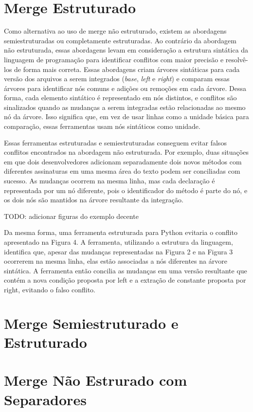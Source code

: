 \section{Merge Estruturado}
Como alternativa ao uso de merge não estruturado, existem as abordagens
semiestruturadas ou completamente estruturadas. Ao contrário da abordagem não
estruturada, essas abordagens levam em consideração a estrutura sintática da
linguagem de programação para identificar conflitos com maior precisão e resolvê-los de 
forma mais correta. Essas abordagens criam árvores sintáticas para
cada versão dos arquivos a serem integrados (\emph{base}, \emph{left} e \emph{right}) 
e comparam essas árvores para identificar nós comuns
e adições ou remoções em cada árvore. Dessa forma, cada elemento sintático
é representado em nós distintos, e conflitos são sinalizados quando as mudanças
a serem integradas estão relacionadas ao mesmo nó da árvore. Isso significa
que, em vez de usar linhas como a unidade básica para comparação, essas ferramentas usam
nós sintáticos como unidade.

Essas ferramentas estruturadas e semiestruturadas conseguem evitar falsos conflitos
encontrados na abordagem não estruturada. Por exemplo, duas situações em
que dois desenvolvedores adicionam separadamente dois novos métodos com diferentes
assinaturas em uma mesma área do texto podem ser conciliadas com sucesso.
As mudanças ocorrem na mesma linha, mas cada declaração é representada por
um nó diferente, pois o identificador do método é parte do nó,
e os dois nós são mantidos na árvore resultante da integração.

TODO: adicionar figuras do exemplo decente

Da mesma forma, uma ferramenta estruturada para Python evitaria o
conflito apresentado na Figura 4. A ferramenta, utilizando a estrutura da
linguagem, identifica que, apesar das mudanças representadas na Figura 2 e na
Figura 3 ocorrerem na mesma linha, elas estão associadas a nós diferentes na árvore
sintática. A ferramenta então concilia as mudanças em uma versão resultante que contém a
nova condição proposta por left e a extração de constante proposta por right,
evitando o falso conflito.
\section{Merge Semiestruturado e Estruturado}
\section{Merge Não Estrurado com Separadores}

